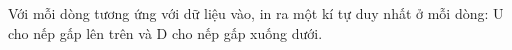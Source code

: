 Với mỗi dòng tương ứng với dữ liệu vào, in ra một kí tự duy nhất ở mỗi dòng: U cho nếp gấp lên trên và D cho nếp gấp xuống dưới.  

\